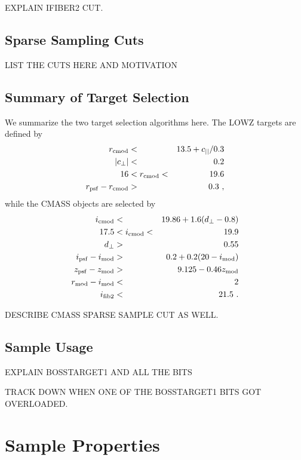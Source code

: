 \documentclass[preprint]{aastex}
\newcommand{\cpp}{c_{\perp}}
\newcommand{\cll}{c_{||}}
\newcommand{\dpp}{d_{\perp}}
\newcommand{\rmod}{r_{\rm mod}}
\newcommand{\imod}{i_{\rm mod}}
\newcommand{\rcmod}{r_{\rm cmod}}
\newcommand{\icmod}{i_{\rm cmod}}
\newcommand{\ipsf}{i_{\rm psf}}
\newcommand{\zpsf}{z_{\rm psf}}
\newcommand{\zmod}{z_{\rm mod}}
\newcommand{\rpsf}{r_{\rm psf}}
\newcommand{\ifib}{i_{\rm fib2}}
\begin{document}
EXPLAIN IFIBER2 CUT.

\subsection{Sparse Sampling Cuts}

LIST THE CUTS HERE AND MOTIVATION

\subsection{Summary of Target Selection}

We summarize the two target selection algorithms here. The LOWZ targets are
defined by 
\begin{eqnarray}
\rcmod  & < & 13.5 + \cll/0.3 \\ 
|\cpp| & < & 0.2 \\
16 & < \rcmod < & 19.6 \\
\rpsf - \rcmod & > & 0.3 \,\,,
\end{eqnarray}
while the CMASS objects are selected by 
\begin{eqnarray}
\icmod & < & 19.86 + 1.6(\dpp - 0.8) \\
17.5 & < \icmod <  & 19.9 \\
\dpp & > & 0.55 \\
\ipsf - \imod & > & 0.2 + 0.2(20 - \imod) \\
\zpsf - \zmod & > & 9.125 - 0.46 \zmod \\
\rmod - \imod & < & 2 \\
\ifib & < & 21.5 \,\,.
\end{eqnarray}

DESCRIBE CMASS SPARSE SAMPLE CUT AS WELL.

\subsection{Sample Usage}

EXPLAIN BOSSTARGET1 AND ALL THE BITS

TRACK DOWN WHEN ONE OF THE BOSSTARGET1 BITS GOT OVERLOADED.

\section{Sample Properties}
\end{document}
